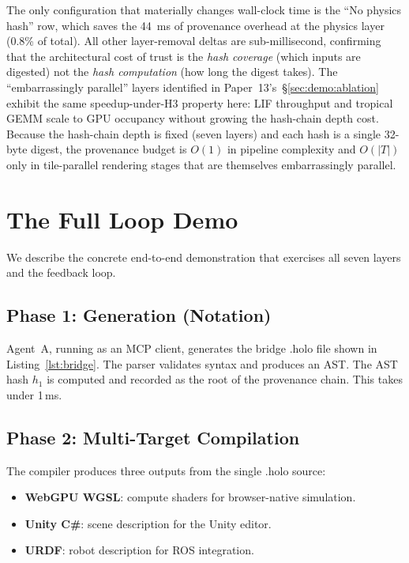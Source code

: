 \documentclass[sigchi-a]{acmart}
\begin{document}
The only configuration that materially changes wall-clock time is the
``No physics hash'' row, which saves the 44~ms of provenance overhead
at the physics layer (0.8\% of total).  All other layer-removal deltas
are sub-millisecond, confirming that the architectural cost of trust
is the \emph{hash coverage} (which inputs are digested) not the
\emph{hash computation} (how long the digest takes).  The
``embarrassingly parallel'' layers identified in
Paper~13's~\S\ref{sec:demo:ablation} exhibit the same
speedup-under-H3 property here: LIF throughput and tropical GEMM
scale to GPU occupancy without growing the hash-chain depth cost.
Because the hash-chain depth is fixed (seven layers) and each hash
is a single 32-byte digest, the provenance budget is
$O(1)$ in pipeline complexity and $O(|T|)$ only in tile-parallel
rendering stages that are themselves embarrassingly parallel.


\section{The Full Loop Demo}
\label{sec:demo}

We describe the concrete end-to-end demonstration that exercises all seven
layers and the feedback loop.

\subsection{Phase 1: Generation (Notation)}

Agent~A, running as an MCP client, generates the bridge .holo file shown in
Listing~\ref{lst:bridge}. The parser validates syntax and produces an AST.
The AST hash $h_1$ is computed and recorded as the root of the provenance
chain. This takes under 1\,ms.

\subsection{Phase 2: Multi-Target Compilation}

The compiler produces three outputs from the single .holo source:
\begin{itemize}
  \item \textbf{WebGPU WGSL}: compute shaders for browser-native simulation.
  \item \textbf{Unity C\#}: scene description for the Unity editor.
  \item \textbf{URDF}: robot description for ROS integration.
\end{itemize}
\end{document}
